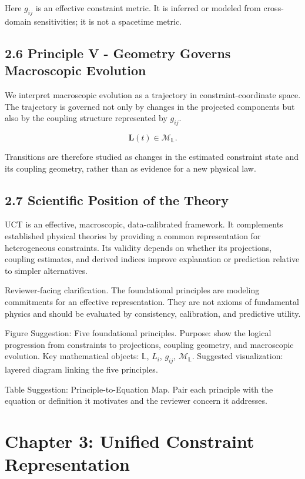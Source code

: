\documentclass[aps,pre,reprint,superscriptaddress,nofootinbib]{revtex4-2}
\begin{document}
Here \(g_{ij}\) is an effective constraint metric. It is inferred or modeled from cross-domain sensitivities; it is not a spacetime metric.

\subsection{2.6 Principle V - Geometry Governs Macroscopic Evolution}

We interpret macroscopic evolution as a trajectory in constraint-coordinate space. The trajectory is governed not only by changes in the projected components but also by the coupling structure represented by \(g_{ij}\).

\[ \mathbf{L}(t) \in \mathcal{M}_{\mathbb{L}}. \]

Transitions are therefore studied as changes in the estimated constraint state and its coupling geometry, rather than as evidence for a new physical law.

\subsection{2.7 Scientific Position of the Theory}

UCT is an effective, macroscopic, data-calibrated framework. It complements established physical theories by providing a common representation for heterogeneous constraints. Its validity depends on whether its projections, coupling estimates, and derived indices improve explanation or prediction relative to simpler alternatives.

Reviewer-facing clarification. The foundational principles are modeling commitments for an effective representation. They are not axioms of fundamental physics and should be evaluated by consistency, calibration, and predictive utility.

Figure Suggestion: Five foundational principles. Purpose: show the logical progression from constraints to projections, coupling geometry, and macroscopic evolution. Key mathematical objects: \(\mathbb{L}\), \(L_i\), \(g_{ij}\), \(\mathcal{M}_{\mathbb{L}}\). Suggested visualization: layered diagram linking the five principles.

Table Suggestion: Principle-to-Equation Map. Pair each principle with the equation or definition it motivates and the reviewer concern it addresses.

\section{Chapter 3: Unified Constraint Representation}
\end{document}
